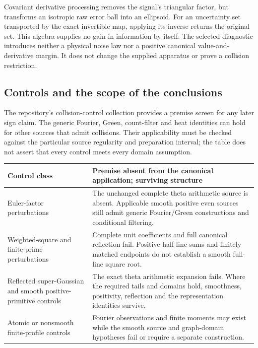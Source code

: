 Covariant derivative processing removes the signal's triangular factor,
 but transforms an isotropic raw error ball into an ellipsoid. For an
uncertainty set transported by the exact invertible map, applying its
inverse returns the original set. This algebra supplies no gain in
information by itself. The selected diagnostic introduces neither a
physical noise law nor a positive canonical value-and-derivative margin.
It does not change the supplied apparatus or prove a collision restriction.

\subsection{Controls and the scope of the conclusions}
The repository's collision-control collection \cite{CollisionControls}
provides a premise screen for any later sign claim. The generic Fourier,
Green, count-filter and heat identities can hold for other sources that
admit collisions. Their applicability must be checked against the
particular source regularity and preparation interval; the table does
not assert that every control meets every domain assumption.

\begin{center}\small
\begin{tabularx}{\textwidth}{@{}>{\raggedright\arraybackslash}p{}Y@{}}\toprule
Control class & Premise absent from the canonical application; surviving structure \\\midrule
Euler-factor perturbations & The unchanged complete theta arithmetic source is absent. Applicable smooth positive even sources still admit generic Fourier/Green constructions and conditional filtering. \\
Weighted-square and finite-prime perturbations & Complete unit coefficients and full canonical reflection fail. Positive half-line sums and finitely matched endpoints do not establish a smooth full-line square root. \\
Reflected super-Gaussian and smooth positive-primitive controls & The exact theta arithmetic expansion fails. Where the required tails and domains hold, smoothness, positivity, reflection and the representation identities survive. \\
Atomic or nonsmooth finite-profile controls & Fourier observations and finite moments may exist while the smooth source and graph-domain hypotheses fail or require a separate construction. \\
\bottomrule\end{tabularx}
\end{center}

